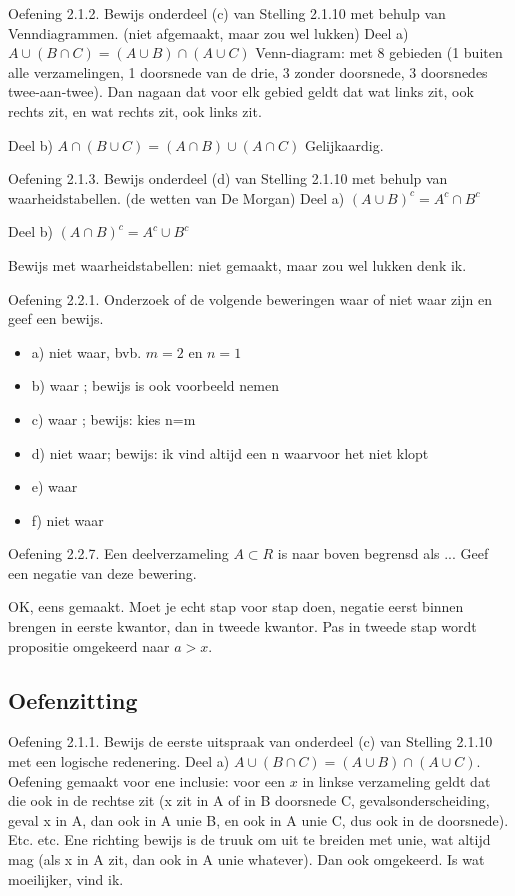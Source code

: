 \documentclass{article}
\begin{document}
Oefening 2.1.2. Bewijs onderdeel (c) van Stelling 2.1.10 met behulp van Venndiagrammen.
(niet afgemaakt, maar zou wel lukken) 
Deel a) $A \cup (B \cap C) = (A \cup B) \cap (A \cup C) $
Venn-diagram: met 8 gebieden (1 buiten alle verzamelingen, 1 doorsnede van de drie, 3 zonder doorsnede, 3 doorsnedes twee-aan-twee). 
Dan nagaan dat voor elk gebied geldt dat wat links zit, ook rechts zit, en wat rechts zit, ook links zit. 

Deel b) $A \cap (B \cup C) = (A \cap B) \cup (A \cap C)$
Gelijkaardig. 

Oefening 2.1.3. Bewijs onderdeel (d) van Stelling 2.1.10 met behulp van waarheidstabellen.
(de wetten van De Morgan)
Deel a) $(A \cup B)^c = A^c \cap B^c$ 

Deel b) $(A \cap B)^c = A^c \cup B^c$ 

Bewijs met waarheidstabellen: niet gemaakt, maar zou wel lukken denk ik. 



Oefening 2.2.1. Onderzoek of de volgende beweringen waar of niet waar zijn en geef een
bewijs.
\begin{itemize}
\item a) niet waar, bvb. $m=2$ en $n=1$
\item b) waar ; bewijs is ook voorbeeld nemen
\item c) waar ; bewijs: kies n=m 
\item d) niet waar; bewijs: ik vind altijd een n waarvoor het niet klopt
\item e) waar
\item f) niet waar

\end{itemize}



Oefening 2.2.7. Een deelverzameling $A \subset R$ is naar boven begrensd als ... Geef een negatie van deze bewering. 

OK, eens gemaakt. Moet je echt stap voor stap doen, negatie eerst binnen brengen in eerste kwantor, dan in tweede kwantor. Pas in tweede stap wordt propositie omgekeerd naar $a>x$. 

\subsection{Oefenzitting}

Oefening 2.1.1. Bewijs de eerste uitspraak van onderdeel (c) van Stelling 2.1.10 met een logische redenering.
Deel a) $A \cup (B \cap C) = (A \cup B) \cap (A \cup C) $. Oefening gemaakt voor ene inclusie: voor een $x$ in linkse verzameling geldt dat die ook in de rechtse zit (x zit in A of in B doorsnede C, gevalsonderscheiding, geval x in A, dan ook in A unie B, en ook in A unie C, dus ook in de doorsnede). Etc. etc. 
Ene richting bewijs is de truuk om uit te breiden met unie, wat altijd mag (als x in A zit, dan ook in A unie whatever). Dan ook omgekeerd. Is wat moeilijker, vind ik. 
\end{document}
